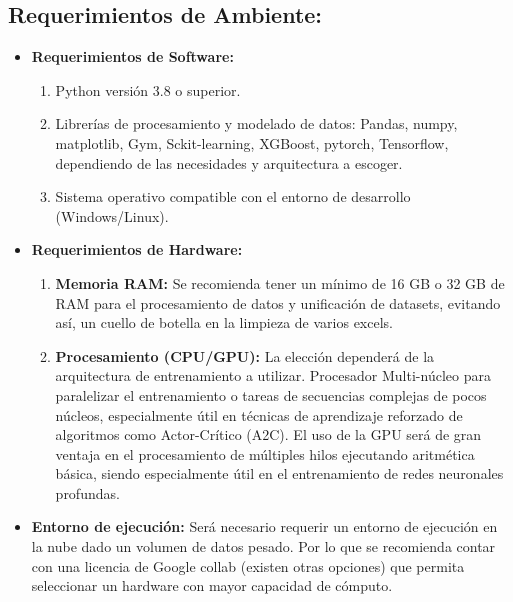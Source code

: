 \documentclass[12pt,a4paper]{article}
\begin{document}
        \subsection{\textbf{Requerimientos de Ambiente:}}
                    \begin{itemize}
                        \item \textbf{Requerimientos de Software:} 
                        \begin{enumerate}
                            \item Python versión 3.8 o superior.
                            \item Librerías de procesamiento y modelado de datos: Pandas, numpy, matplotlib, Gym, Sckit-learning, XGBoost, pytorch, Tensorflow, dependiendo de las necesidades y arquitectura a escoger.
                            \item Sistema operativo compatible con el entorno de desarrollo (Windows/Linux).
                        \end{enumerate}
                        \item \textbf{Requerimientos de Hardware:}
                        \begin{enumerate}
                            \item \textbf{Memoria RAM:} Se recomienda tener un mínimo de 16 GB o 32 GB de RAM para el procesamiento de datos y unificación de datasets, evitando así, un cuello de botella en la limpieza de varios excels.
                            \item \textbf{Procesamiento (CPU/GPU):} La elección dependerá de la arquitectura de entrenamiento a utilizar. Procesador Multi-núcleo para paralelizar el entrenamiento o tareas de secuencias complejas de pocos núcleos, especialmente útil en técnicas de aprendizaje reforzado de algoritmos como Actor-Crítico (A2C). El uso de la GPU será de gran ventaja en el procesamiento de múltiples hilos ejecutando aritmética básica, siendo especialmente útil en el entrenamiento de redes neuronales profundas. 
                        \end{enumerate}
                        \item \textbf{Entorno de ejecución:} Será necesario requerir un entorno de ejecución en la nube dado un volumen de datos pesado. Por lo que se recomienda contar con una licencia de Google collab (existen otras opciones) que permita seleccionar un hardware con mayor capacidad de cómputo. 
                    \end{itemize}
                
\end{document}
